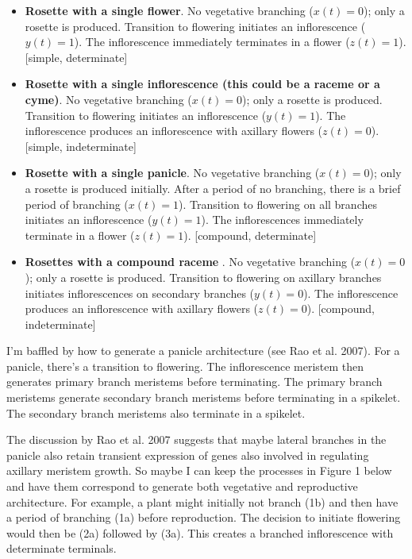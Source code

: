\documentclass[12pt, oneside]{article}   	%
\begin{document}
\begin{itemize}
  \item \textbf{Rosette with a single flower}. No vegetative branching ($x(t) = 0$); only a rosette is produced. Transition to flowering initiates an inflorescence ($y(t) = 1$). The inflorescence immediately terminates in a flower ($z(t) = 1$). [simple, determinate]
   \item \textbf{Rosette with a single inflorescence (this could be a raceme or a cyme)}. No vegetative branching ($x(t) = 0$); only a rosette is produced. Transition to flowering initiates an inflorescence ($y(t) = 1$). The inflorescence produces an inflorescence with axillary flowers ($z(t) = 0$). [simple, indeterminate]
    \item \textbf{Rosette with a single panicle}. No vegetative branching ($x(t) = 0$); only a rosette is produced initially. After a period of no branching, there is a brief period of branching ($x(t) = 1$). Transition to flowering on all branches initiates an inflorescence ($y(t) = 1$). The inflorescences immediately terminate in a flower ($z(t) = 1$). [compound, determinate]
    \item \textbf{Rosettes with a compound raceme }. No vegetative branching ($x(t) = 0$); only a rosette is produced. Transition to flowering on axillary branches initiates inflorescences on secondary branches ($y(t) = 0$). The inflorescence produces an inflorescence with axillary flowers ($z(t) = 0$). [compound, indeterminate]
  
\end{itemize}

I'm baffled by how to generate a panicle architecture (see Rao et al. 2007). For a panicle, there's a transition to flowering. The inflorescence meristem then generates primary branch meristems before terminating. The primary branch meristems generate secondary branch meristems before terminating in a spikelet. The secondary branch meristems also terminate in a spikelet. 

The discussion by Rao et al. 2007 suggests that maybe lateral branches in the panicle also retain transient expression of genes also involved in regulating axillary meristem growth. So maybe I can keep the processes in Figure 1 below and have them correspond to generate both vegetative and reproductive architecture. For example, a plant might initially not branch (1b) and then have a period of branching (1a) before reproduction. The decision to initiate flowering would then be (2a) followed by (3a). This creates a branched inflorescence with determinate terminals. 
\end{document}
